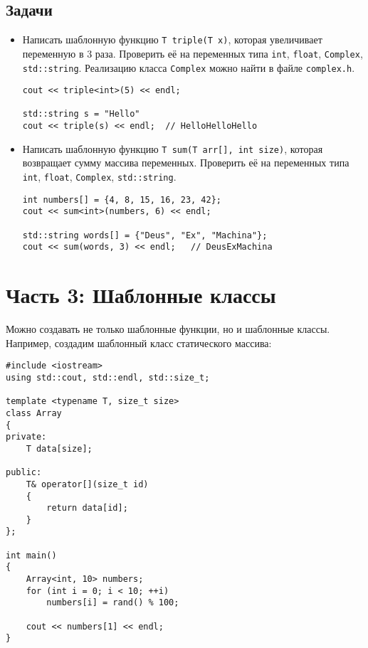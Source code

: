 \documentclass{article}
\begin{document}
\subsection*{Задачи}
\begin{itemize}
\item Написать шаблонную функцию \texttt{T triple(T x)}, которая увеличивает переменную в 3 раза. Проверить её на переменных типа \texttt{int}, \texttt{float}, \texttt{Complex}, \texttt{std::string}. Реализацию класса \texttt{Complex} можно найти в файле \texttt{complex.h}.
\begin{lstlisting}
cout << triple<int>(5) << endl;
    
std::string s = "Hello"
cout << triple(s) << endl;  // HelloHelloHello
\end{lstlisting}
\item Написать шаблонную функцию \texttt{T sum(T arr[], int size)}, которая возвращает сумму массива переменных. Проверить её на переменных типа \texttt{int}, \texttt{float}, \texttt{Complex}, \texttt{std::string}.
\begin{lstlisting}
int numbers[] = {4, 8, 15, 16, 23, 42};
cout << sum<int>(numbers, 6) << endl;
    
std::string words[] = {"Deus", "Ex", "Machina"};
cout << sum(words, 3) << endl;   // DeusExMachina
\end{lstlisting}
\end{itemize}

\newpage

\section*{Часть 3: Шаблонные классы}
Можно создавать не только шаблонные функции, но и шаблонные классы. Например, создадим шаблонный класс статического массива:
\begin{lstlisting}
#include <iostream>
using std::cout, std::endl, std::size_t;

template <typename T, size_t size>
class Array 
{
private:
    T data[size];

public:
    T& operator[](size_t id) 
    {
        return data[id];
    }
};

int main() 
{
    Array<int, 10> numbers;
    for (int i = 0; i < 10; ++i)
        numbers[i] = rand() % 100;

    cout << numbers[1] << endl;
}
\end{lstlisting}
\end{document}
